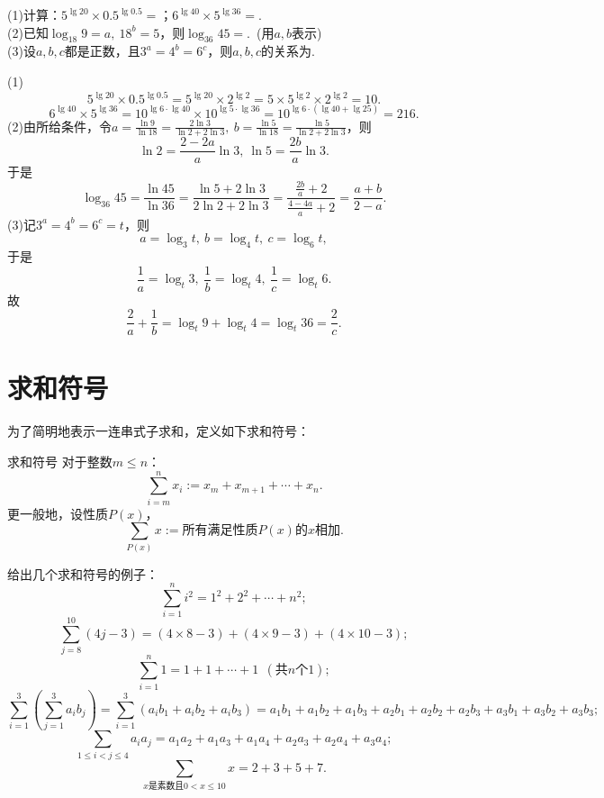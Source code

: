 \documentclass[lang=cn, zihao=5]{elegantbook}
\newcommand{\ssb}[1]{\left( #1 \right)}
\newcommand{\tk}{\uline{\hspace{4em}}}
\begin{document}
\begin{example}
	(1)计算：$5^{\lg 20} \times 0.5^{\lg 0.5}=$\tk ；$6^{\lg 40} \times 5^{\lg 36}=$\tk . \\
	(2)已知$\log_{18}{9}=a,~18^b=5$，则$\log_{36}{45}=$\tk .~(用$a,b$表示) \\
	(3)设$a,b,c$都是正数，且$3^a=4^b=6^c$，则$a,b,c$的关系为\tk .
\end{example}
\begin{solution}
	(1)$$5^{\lg 20} \times 0.5^{\lg 0.5} = 5^{\lg 20} \times 2^{\lg 2} = 5 \times 5^{\lg 2} \times 2^{\lg 2} = 10.$$
	$$6^{\lg 40} \times 5^{\lg 36} = 10^{\lg 6 \cdot \lg 40} \times 10^{\lg 5 \cdot \lg 36} = 10^{\lg 6 \cdot (\lg 40 + \lg 25)} = 216.$$
	(2)由所给条件，令$a=\frac{\ln{9}}{\ln{18}}=\frac{2\ln{3}}{\ln{2}+2\ln{3}} ,~b=\frac{\ln{5}}{\ln{18}}=\frac{\ln{5}}{\ln{2}+2\ln{3}}$，则$$\ln{2}=\frac{2-2a}{a}\ln{3},~\ln{5}=\frac{2b}{a}\ln{3}.$$
	于是
	$$\log_{36}{45} = \frac{\ln{45}}{\ln{36}} = \frac{\ln{5} + 2\ln{3}}{2\ln{2}+2\ln{3}} = \frac{\frac{2b}{a}+2}{\frac{4-4a}{a}+2} = \frac{a+b}{2-a}.$$
	(3)记$3^a=4^b=6^c=t$，则$$a=\log_{3}{t},~b=\log_{4}{t},~c=\log_{6}{t},$$
	于是$$\frac{1}{a}=\log_{t}{3},~\frac{1}{b}=\log_{t}{4},~\frac{1}{c}=\log_{t}{6}.$$
	故$$\frac{2}{a} + \frac{1}{b} = \log_{t}{9} + \log_{t}{4} = \log_{t}{36} = \frac{2}{c}.$$
\end{solution}

\vspace{4em}
\section{求和符号}

为了简明地表示一连串式子求和，定义如下求和符号：

\begin{definition}{求和符号}
	对于整数$m \leq n$：$$\sum_{i=m}^{n} x_i := x_m + x_{m+1} + \cdots + x_{n}.$$
	更一般地，设性质$P(x)$，$$\sum_{P(x)} x := \textit{所有满足性质$P(x)$的$x$相加}.$$
\end{definition}

给出几个求和符号的例子：
$$\sum_{i=1}^{n} i^2 = 1^2 + 2^2 + \cdots + n^2;$$
$$\sum_{j=8}^{10} (4j-3) = (4 \times 8-3) + (4 \times 9 - 3) + (4 \times 10 -3);$$
$$\sum_{i=1}^{n} 1 = 1 + 1 + \cdots + 1~~(\textit{共$n$个$1$});$$
$$\sum_{i=1}^{3} \ssb{\sum_{j=1}^{3} a_ib_j} = \sum_{i=1}^{3} \ssb{a_ib_1+a_ib_2+a_ib_3} = a_1b_1+a_1b_2+a_1b_3+a_2b_1+a_2b_2+a_2b_3+a_3b_1+a_3b_2+a_3b_3;$$
$$\sum_{1 \leq i < j \leq 4} a_ia_j = a_1a_2 + a_1a_3 + a_1a_4 + a_2a_3 + a_2a_4 + a_3a_4;$$
$$\sum_{\textit{$x$是素数且$0< x \leq 10$}} x = 2+3+5+7.$$
\end{document}

